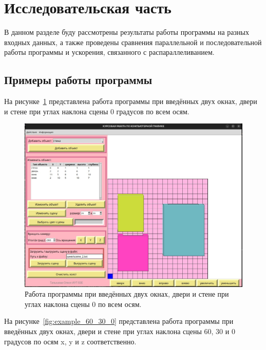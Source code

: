 \section{Исследовательская часть}

\hspace{1.25cm}
В данном разделе буду рассмотрены результаты работы программы на разных входных данных, а также проведены сравнения параллельной и последовательной работы программы и ускорения, связанного с распараллеливанием.


\subsection{Примеры работы программы}

\hspace{1.25cm}
На рисунке~\ref{fig:example_0_0_0} представлена работа программы при введённых двух окнах, двери и стене при углах наклона сцены 0 градусов по всем осям.

\begin{figure}[H]
    \centering
    \includegraphics[width=1\textwidth]{img/example_0_0_0.png}
    \caption{Работа программы при введённых двух окнах, двери и стене при углах наклона сцены 0 по всем осям.}
    \label{fig:example_0_0_0}
\end{figure}

На рисунке~\ref{fig:example_60_30_0} представлена работа программы при введённых двух окнах, двери и стене при углах наклона сцены 60, 30 и 0 градусов по осям x, y и z соответственно.

